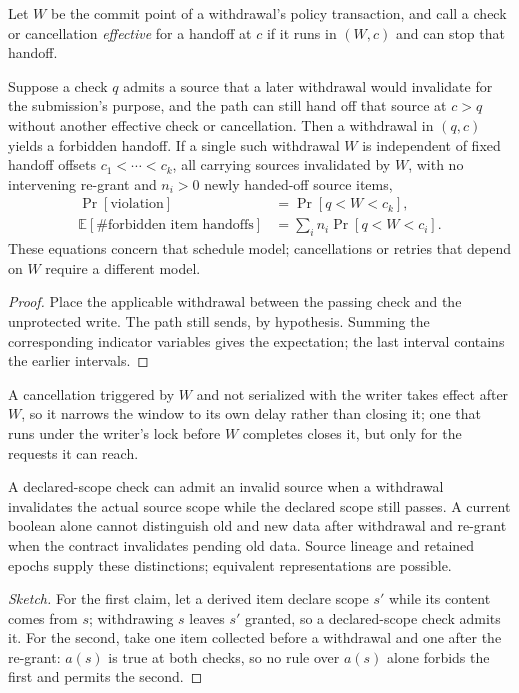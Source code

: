 Let $W$ be the commit point of a withdrawal's policy transaction, and call a check or cancellation \emph{effective}
for a handoff at $c$ if it runs in $(W,c)$ and can stop that handoff.
\begin{theorem}\label{thm:race}
Suppose a check $q$ admits a source that a later withdrawal would invalidate for the
submission's purpose, and the path can still hand off that source at $c>q$ without
another effective check or cancellation. Then a withdrawal in $(q,c)$ yields a forbidden
handoff. If a single such withdrawal $W$ is independent of fixed handoff offsets
$c_1<\cdots<c_k$, all carrying sources invalidated by $W$, with no intervening re-grant and $n_i>0$ newly handed-off source items,
\begin{equation}
\begin{aligned}
\Pr[\text{violation}]&=\Pr[q<W<c_k],\\
\mathbb E[\#\text{forbidden item handoffs}]&=\sum_i n_i\Pr[q<W<c_i].
\end{aligned}\label{eq:race}
\end{equation}
These equations concern that schedule model; cancellations or retries that depend on
$W$ require a different model.
\end{theorem}
\begin{proof}
Place the applicable withdrawal between the passing check and the unprotected write.
The path still sends, by hypothesis. Summing the corresponding indicator variables
gives the expectation; the last interval contains the earlier intervals.
\end{proof}
A cancellation triggered by $W$ and not serialized with the writer takes effect after $W$, so it narrows the window to its own delay rather than closing it; one that runs under the writer's lock before $W$ completes closes it, but only for the requests it can reach.

\begin{proposition}\label{prop:nec}
A declared-scope check can admit an invalid source when a withdrawal invalidates the
actual source scope while the declared scope still passes. A current boolean alone
cannot distinguish old and new data after withdrawal and re-grant when the contract
invalidates pending old data. Source lineage and retained epochs supply these distinctions;
equivalent representations are possible.
\end{proposition}
\begin{proof}[Sketch]
For the first claim, let a derived item declare scope $s'$ while its content comes from $s$; withdrawing $s$ leaves $s'$
granted, so a declared-scope check admits it. For the second, take one item collected before a withdrawal and one after
the re-grant: $a(s)$ is true at both checks, so no rule over $a(s)$ alone forbids the first and permits the second.
\end{proof}

